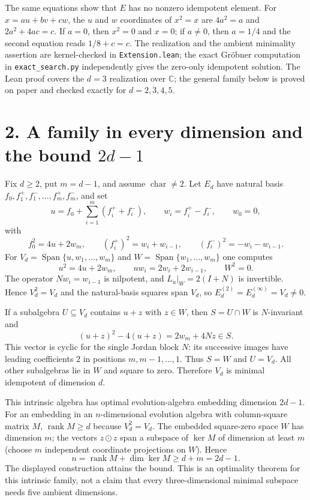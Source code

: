 \documentclass[11pt]{article}
\newcommand{\Span}{\operatorname{Span}}
\newcommand{\charK}{\operatorname{char}
}
\begin{document}
The same equations show that $E$ has no nonzero idempotent element.  For
$x=au+bv+cw$, the $u$ and $w$ coordinates of $x^2=x$ are
$4a^2=a$ and $2a^2+4ac=c$.  If $a=0$, then $x^2=0$ and $x=0$; if
$a\ne0$, then $a=1/4$ and the second equation reads $1/8+c=c$.
The realization and the ambient minimality assertion are kernel-checked in
\texttt{Extension.lean}; the exact Gröbner computation in
\texttt{exact\_search.py} independently gives the zero-only idempotent
solution.  The Lean proof covers the $d=3$ realization over $\mathbb C$;
the general family below is proved on paper and checked exactly for
$d=2,3,4,5$.

\section*{2. A family in every dimension and the bound $2d-1$}
Fix $d\ge2$, put $m=d-1$, and assume $\charK\ne2$.  Let $E_d$ have natural
basis $f_0,f_1^+,f_1^-,\ldots,f_m^+,f_m^-$, and set
\[
 u=f_0+\sum_{i=1}^m(f_i^++f_i^-),\qquad w_i=f_i^+-f_i^-,\qquad w_0=0,
\]
with
\[
 f_0^2=4u+2w_m,\qquad (f_i^+)^2=w_i+w_{i-1},\qquad
 (f_i^-)^2=-w_i-w_{i-1}.
\]
For $V_d=\Span\{u,w_1,\ldots,w_m\}$ and
$W=\Span\{w_1,\ldots,w_m\}$ one computes
\[
 u^2=4u+2w_m,\qquad uw_i=2w_i+2w_{i-1},\qquad W^2=0.       \tag{2}
\]
The operator $Nw_i=w_{i-1}$ is nilpotent, and
$L_u|_W=2(I+N)$ is invertible.  Hence $V_d^2=V_d$ and the natural-basis
squares span $V_d$, so $E_d^{(2)}=E_d^{(\infty)}=V_d\ne0$.

If a subalgebra $U\subseteq V_d$ contains $u+z$ with $z\in W$, then
$S=U\cap W$ is $N$-invariant and
\[
 (u+z)^2-4(u+z)=2w_m+4Nz\in S.
\]
This vector is cyclic for the single Jordan block $N$: its successive images
have leading coefficients $2$ in positions $m,m-1,\ldots,1$.  Thus
$S=W$ and $U=V_d$.  All other subalgebras lie in $W$ and square to zero.
Therefore $V_d$ is minimal idempotent of dimension $d$.

This intrinsic algebra has optimal evolution-algebra embedding dimension
$2d-1$.  For an embedding in an $n$-dimensional evolution algebra with
column-square matrix $M$, $\operatorname{rank}M\ge d$ because $V_d^2=V_d$.
The embedded square-zero space $W$ has dimension $m$; the vectors $z\odot z$
span a subspace of $\ker M$ of dimension at least $m$ (choose $m$ independent
coordinate projections on $W$).  Hence
\[
 n=\operatorname{rank}M+\dim\ker M\ge d+m=2d-1.
\]
The displayed construction attains the bound.  This is an optimality theorem
for this intrinsic family, not a claim that every three-dimensional minimal
subspace needs five ambient dimensions.
\end{document}
